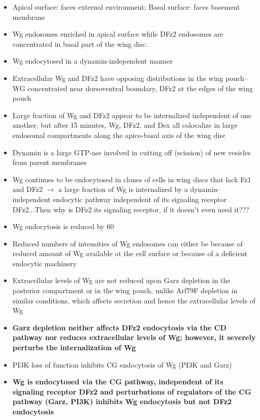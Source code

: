\documentclass[12pt]{article}
\begin{document}
\begin{enumerate}
\begin{itemize}
	\item Apical surface: faces external environment; Basal surface: faces basement membrane
	\item Wg endosomes enriched in apical surface while DFz2 endosomes are concentrated in basal part of the wing disc. 
	\item Wg endocytosed in a dynamin-independent manner
	\item Extracellular Wg and DFz2 have opposing distributions in the wing pouch--WG concentrated near dorsoventral boundary, DFz2 at the edges of the wing pouch
	\item Large fraction of Wg and DFz2 appear to be internalized independent of one another, but after 15 minutes, Wg, DFz2, and Dex all colocalize in large endosomal compartments along the apico-basal axis of the wing disc
	\item Dynamin is a large GTP-ase involved in cutting off (scission) of new vesicles from parent membranes
	\item Wg continues to be endocytosed in clones of cells in wing discs that lack Fz1 and DFz2 $\rightarrow$ a large fraction of Wg is internalized by a dynamin-independent endocytic pathway independent of its signaling receptor DFz2...Then why is DFz2 its signaling receptor, if it doesn't even need it???
	\item Wg endocytosis is reduced by 60%
	\item Reduced numbers of intensities of Wg endosomes can either be because of reduced amount of Wg available at the cell surface or because of a deficient endocytic machinery
	\item Extracellular levels of Wg are not reduced upon Garz depletion in the posterior compartment or in the wing pouch, unlike Arf79F depletion in similar conditions, which affects secretion and hence the extracellular levels of Wg
	\item \textbf{Garz depletion neither affects DFz2 endocytosis via the CD pathway nor reduces extracellular levels of Wg; however, it severely perturbs the internalization of Wg}
	\item PI3K loss of function inhibits CG endocytosis of Wg (PI3K and Garz)
	\item \textbf{Wg is endocytosed via the CG pathway, independent of its signaling receptor DFz2 and perturbations of regulators of the CG pathway (Garz, PI3K) inhibits Wg endocytosis but not DFz2 endocytosis}

\end{itemize}
\end{enumerate}
\end{document}
